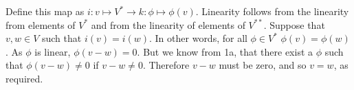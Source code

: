 Define this map as $i:v \mapsto V^*\to k : \phi \mapsto \phi(v)$.
Linearity follows from the linearity from elements of $V^*$ and from the linearity of elements of $V^{**}$.
Suppose that $v,w \in V$ such that $i(v)=i(w)$. In other words, for all $\phi \in V^*$ $\phi(v)=\phi(w)$. As $\phi$ is linear, $\phi(v-w)=0$. But we know from 1a, that there exist a $\phi$ such that $\phi(v-w) \neq 0$ if $v-w \neq 0$. Therefore $v-w$ must be zero, and so $v=w$, as required.